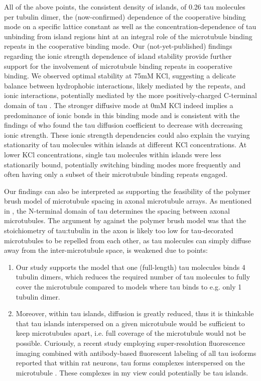 All of the above points, the consistent density of islands, of 0.26 tau molecules per tubulin dimer, the (now-confirmed) dependence of the cooperative binding mode on a specific lattice constant \parencite{siahaan2022microtubule} as well as the concentration-dependence of tau unbinding from island regions hint at an integral role of the microtubule binding repeats in the cooperative binding mode. Our (not-yet-published) findings regarding the ionic strength dependence of island stability  provide further support for the involvement of microtubule binding repeats in cooperative binding. We observed optimal stability at 75mM KCl, suggesting a delicate balance between hydrophobic interactions, likely mediated by the repeats, and ionic interactions, potentially mediated by the more positively-charged C-terminal domain of tau . The stronger diffusive mode at 0mM KCl indeed implies a predominance of ionic bonds in this binding mode and is consistent with the findings of \cite{Hinrichs2012b} who found the tau diffusion coefficient to decrease with decreasing ionic strength. These ionic strength dependencies could also explain the varying stationarity of tau molecules within islands at different KCl concentrations. At lower KCl concentrations, single tau molecules within islands were less stationarily bound, potentially switching binding modes more frequently and often having only a subset of their microtubule binding repeats engaged.\par

Our findings can also be interpreted as supporting the feasibility of the polymer brush model of microtubule spacing in axonal microtubule arrays. As mentioned in , the N-terminal domain of tau determines the spacing between axonal microtubules. The argument by \cite{Gaspard} against the polymer brush model was that the stoichiometry of tau:tubulin in the axon is likely too low for tau-decorated microtubules to be repelled from each other, as tau molecules can simply diffuse away from the inter-microtubule space, is weakened due to points:
\begin{enumerate}
    \item Our study supports the model that one (full-length) tau molecules binds 4 tubulin dimers, which reduces the required number of tau molecules to fully cover the microtubule compared to models where tau binds to e.g. only 1 tubulin dimer.
    \item Moreover, within tau islands, diffusion is greatly reduced, thus it is thinkable that tau islands interspersed on a given microtubule would be sufficient to keep microtubules apart, i.e. full coverage of the microtubule would not be possible. Curiously, a recent study employing super-resolution fluorescence imaging combined with antibody-based fluorescent labeling of all tau isoforms reported that within rat neurons, tau forms complexes interspersed on the microtubule . These complexes in my view could potentially be tau islands.
\end{enumerate}

